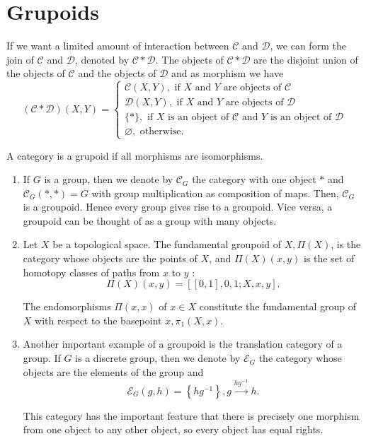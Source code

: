 \section{Grupoids}

If we want a limited amount of interaction between $\mathcal{C}$ and $\mathcal{D}$, we can form the join of $\mathcal{C}$ and $\mathcal{D}$, denoted by $\mathcal{C} * \mathcal{D}$. The objects of $\mathcal{C} * \mathcal{D}$ are the disjoint union of the objects of $\mathcal{C}$ and the objects of $\mathcal{D}$ and as morphism we have
$$
(\mathcal{C} * \mathcal{D})(X, Y)=\left\{\begin{array}{l}
\mathcal{C}(X, Y), \text { if } X \text { and } Y \text { are objects of } \mathcal{C} \\
\mathcal{D}(X, Y), \text { if } X \text { and } Y \text { are objects of } \mathcal{D} \\
\{*\}, \text { if } X \text { is an object of } \mathcal{C} \text { and } Y \text { is an object of } \mathcal{D} \\
\varnothing, \text { otherwise. }
\end{array}\right.
$$

A category is a grupoid if all morphisms are isomorphisms.

\begin{example}
    \begin{enumerate}
        \item If $G$ is a group, then we denote by $\mathcal{C}_G$ the category with one object $*$ and $\mathcal{C}_G(*, *)=G$ with group multiplication as composition of maps. Then, $\mathcal{C}_G$ is a groupoid. Hence every group gives rise to a groupoid. Vice versa, a groupoid can be thought of as a group with many objects.
        \item Let $X$ be a topological space. The fundamental groupoid of $X, \Pi(X)$, is the category whose objects are the points of $X$, and $\Pi(X)(x, y)$ is the set of homotopy classes of paths from $x$ to $y$ :
        $$
        \Pi(X)(x, y)=[[0,1], 0,1 ; X, x, y] .
        $$
        
        The endomorphisms $\Pi(x, x)$ of $x \in X$ constitute the fundamental group of $X$ with respect to the basepoint $x, \pi_1(X, x)$.
        \item Another important example of a groupoid is the translation category of a group. If $G$ is a discrete group, then we denote by $\mathcal{E}_G$ the category whose objects are the elements of the group and $$\mathcal{E}_G(g, h)=\left\{h g^{-1}\right\}, g \xrightarrow{h g^{-1}} h.$$

        This category has the important feature that there is precisely one morphism from one object to any other object, so every object has equal rights.

    \end{enumerate}
\end{example}










